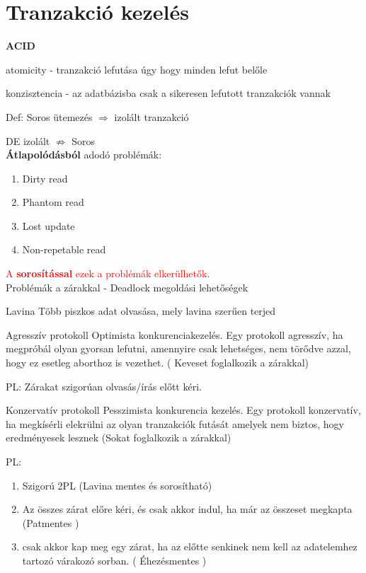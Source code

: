 \section{Tranzakció kezelés}

\textbf{ACID} %

atomicity - tranzakció lefutása úgy hogy minden lefut belőle

konzisztencia - az adatbázisba csak a sikeresen lefutott tranzakciók vannak

Def: Soros ütemezés $\Rightarrow$ izolált tranzakció

DE izolált $\nRightarrow$ Soros \\[2pt]


\textbf{Átlapolódásból} adodó problémák:
 \begin{enumerate} \setlength\itemsep{-0.5mm}
 	\item Dirty read
 	\item Phantom read
 	\item Lost update
 	\item Non-repetable read
 \end{enumerate}
\textcolor{red}{ A \textbf{sorosítással} ezek a problémák elkerülhetők.}\\[2pt]


Problémák a zárakkal - Deadlock megoldási lehetőségek \\[2pt]


\begin{definicio}{Lavina}
	Több piszkos adat olvasása, mely lavina szerűen terjed\\[-3pt]
\end{definicio}

\begin{definicio}{Agresszív protokoll}
Optimista konkurenciakezelés. Egy protokoll agresszív, ha megpróbál olyan gyorsan lefutni, amennyire csak lehetséges, nem törődve azzal, hogy ez esetleg aborthoz is vezethet. ( Keveset foglalkozik a zárakkal)

PL: Zárakat szigorúan olvasás/írás előtt kéri.\\[-3pt]
\end{definicio}

\begin{definicio}{Konzervatív protokoll}
Pesszimista konkurencia kezelés. Egy protokoll konzervatív, ha megkísérli elekrülni az olyan tranzakciók futását amelyek nem biztos, hogy eredményesek lesznek (Sokat foglalkozik a zárakkal)

PL:\\[-21pt]

\begin{enumerate} \setlength\itemsep{0mm}
	\item Szigorú 2PL (Lavina mentes és sorosítható)
	\item Az összes zárat előre kéri, és csak akkor indul, ha már az összeset megkapta (Patmentes )
	\item csak akkor kap meg egy zárat, ha az előtte senkinek nem kell az adatelemhez tartozó várakozó sorban. ( Éhezésmentes )
\end{enumerate}

\end{definicio}

